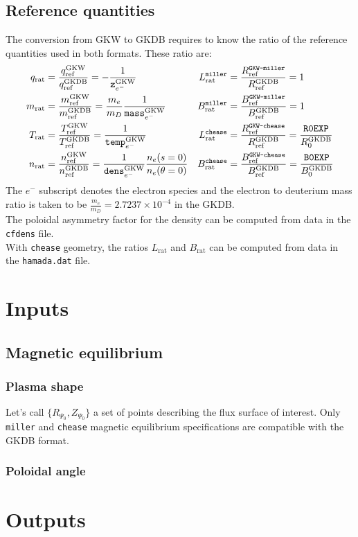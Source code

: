 \documentclass[a4paper]{report}
\begin{document}
\section{Reference quantities}
The conversion from GKW to GKDB requires to know the ratio of the reference quantities used in both formats.  These ratio are:
\begin{align*}
q_\textrm{rat} &=  \frac{q_{\textrm{ref}}^{\textrm{GKW}}}{q_{\textrm{ref}}^{\textrm{GKDB}}} = - \frac{1}{\texttt{z}^{\textrm{GKW}}_{e^-}} & L_\textrm{rat}^\texttt{miller} &= \frac{R_{\textrm{ref}}^\texttt{GKW-miller}}{R_{\textrm{ref}}^{\textrm{GKDB}}} = 1 \\
m_\textrm{rat} &=  \frac{m_{\textrm{ref}}^{\textrm{GKW}}}{m_{\textrm{ref}}^{\textrm{GKDB}}} = \frac{m_e}{m_D}\frac{1}{\texttt{mass}^{\textrm{GKW}}_{e^-}} & B_\textrm{rat}^\texttt{miller} &= \frac{B_{\textrm{ref}}^\texttt{GKW-miller}}{B_{\textrm{ref}}^{\textrm{GKDB}}} = 1 \\
T_\textrm{rat} &=  \frac{T_{\textrm{ref}}^{\textrm{GKW}}}{T_{\textrm{ref}}^{\textrm{GKDB}}} = \frac{1}{\texttt{temp}^{\textrm{GKW}}_{e^-}} &L_\textrm{rat}^\texttt{chease} &= \frac{R_{\textrm{ref}}^\texttt{GKW-chease}}{R_{\textrm{ref}}^{\textrm{GKDB}}} = \frac{\texttt{R0EXP}}{R_0^{\textrm{GKDB}}}  \\
n_\textrm{rat} &=  \frac{n_{\textrm{ref}}^{\textrm{GKW}}}{n_{\textrm{ref}}^{\textrm{GKDB}}} = \frac{1}{\texttt{dens}^{\textrm{GKW}}_{e^-}} \frac{n_e(s=0)}{n_e(\theta=0)} & B_\textrm{rat}^\texttt{chease} &= \frac{B_{\textrm{ref}}^\texttt{GKW-chease}}{B_{\textrm{ref}}^{\textrm{GKDB}}} = \frac{\texttt{B0EXP}}{B_0^{\textrm{GKDB}}}
\end{align*}
The $e^-$ subscript denotes the electron species and the electron to deuterium mass ratio is taken to be $\frac{m_e}{m_D}=2.7237 \times 10^{-4}$ in the GKDB.\\
The poloidal asymmetry factor for the density can be computed from data in the \texttt{cfdens} file.\\
 With \texttt{chease} geometry, the ratios $ L_\textrm{rat}$ and $ B_\textrm{rat}$ can be computed from data in the \texttt{hamada.dat} file.

\chapter{Inputs}
\section{Magnetic equilibrium} \label{sec:magequil}
\subsection{Plasma shape}
Let's call $\{R_{\Psi_0},Z_{\Psi_0}\}$ a set of points describing the flux surface of interest. 
Only \texttt{miller} and \texttt{chease} magnetic equilibrium specifications are compatible with the GKDB format.  

\subsection{Poloidal angle}



\chapter{Outputs}



\end{document}
